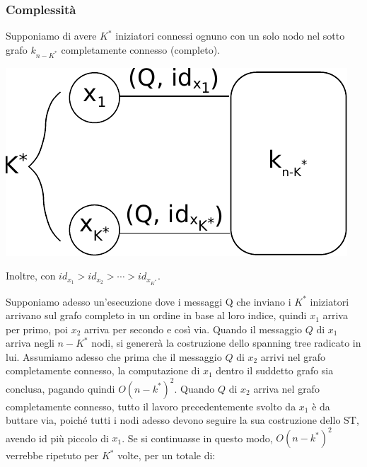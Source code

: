 \subsubsection{Complessità}
Supponiamo di avere $K^*$ iniziatori connessi ognuno con un solo nodo nel sotto
grafo $k_{n-K^*}$ completamente connesso (completo).
\begin{center}
    \includegraphics[scale=0.9]{capitoli/costruzione-spanning-tree/imgs/n_39}
\end{center}
Inoltre, con $id_{x_1} > id_{x_2} > \cdots > id_{x_{K^*}}$.

Supponiamo adesso un'esecuzione dove i messaggi Q che inviano i $K^*$ iniziatori
arrivano sul grafo completo in un ordine in base al loro indice, quindi $x_1$
arriva per primo, poi $x_2$ arriva per secondo e così via. Quando il messaggio
$Q$ di $x_1$ arriva negli $n-K^*$ nodi, si genererà la costruzione dello
spanning tree radicato in lui. Assumiamo adesso che prima che il messaggio $Q$
di $x_2$ arrivi nel grafo completamente connesso, la computazione di $x_1$
dentro il suddetto grafo sia conclusa, pagando quindi $O(n-k^*)^2$. Quando $Q$
di $x_2$ arriva nel grafo completamente connesso, tutto il lavoro
precedentemente svolto da $x_1$ è da buttare via, poiché tutti i nodi adesso
devono seguire la sua costruzione dello ST, avendo id più piccolo di $x_1$. Se
si continuasse in questo modo, $O(n-k^*)^2$ verrebbe ripetuto per $K^*$ volte,
per un totale di:


